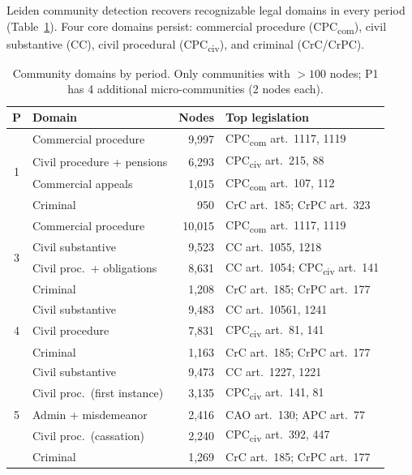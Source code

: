 \documentclass[11pt]{article}
\begin{document}
Leiden community detection recovers recognizable legal domains in every period (Table~\ref{tab:domains}).
Four core domains persist: commercial procedure (CPC\textsubscript{com}), civil substantive (CC), civil procedural (CPC\textsubscript{civ}), and criminal (CrC/CrPC).

\begin{table}[t]
\centering
\small
\caption{Community domains by period. Only communities with $> 100$ nodes; P1 has 4 additional micro-communities (2 nodes each).}
\label{tab:domains}
\begin{tabular}{@{}clrl@{}}
\toprule
\textbf{P} & \textbf{Domain} & \textbf{Nodes} & \textbf{Top legislation} \\
\midrule
\multirow{4}{*}{1} & Commercial procedure & 9{,}997 & CPC\textsubscript{com} art.~1117, 1119 \\
 & Civil procedure + pensions & 6{,}293 & CPC\textsubscript{civ} art.~215, 88 \\
 & Commercial appeals & 1{,}015 & CPC\textsubscript{com} art.~107, 112 \\
 & Criminal & 950 & CrC art.~185; CrPC art.~323 \\
\midrule
\multirow{4}{*}{3} & Commercial procedure & 10{,}015 & CPC\textsubscript{com} art.~1117, 1119 \\
 & Civil substantive & 9{,}523 & CC art.~1055, 1218 \\
 & Civil proc.\ + obligations & 8{,}631 & CC art.~1054; CPC\textsubscript{civ} art.~141 \\
 & Criminal & 1{,}208 & CrC art.~185; CrPC art.~177 \\
\midrule
\multirow{3}{*}{4} & Civil substantive & 9{,}483 & CC art.~10561, 1241 \\
 & Civil procedure & 7{,}831 & CPC\textsubscript{civ} art.~81, 141 \\
 & Criminal & 1{,}163 & CrC art.~185; CrPC art.~177 \\
\midrule
\multirow{5}{*}{5} & Civil substantive & 9{,}473 & CC art.~1227, 1221 \\
 & Civil proc.\ (first instance) & 3{,}135 & CPC\textsubscript{civ} art.~141, 81 \\
 & Admin + misdemeanor & 2{,}416 & CAO art.~130; APC art.~77 \\
 & Civil proc.\ (cassation) & 2{,}240 & CPC\textsubscript{civ} art.~392, 447 \\
 & Criminal & 1{,}269 & CrC art.~185; CrPC art.~177 \\
\bottomrule
\end{tabular}
\end{table}
\end{document}

